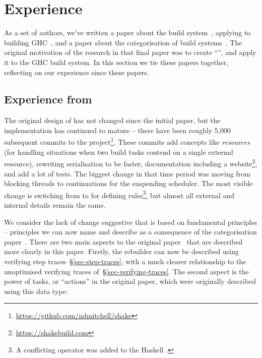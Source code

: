 \section{Experience}\label{sec-experience}

As a set of authors, we've written a paper about the \Shake build
system~\cite{mitchell2012shake}, applying \Shake to building GHC~\cite{hadrian},
and a paper about the categorisation of build
systems~\cite{mokhov2018buildsystems}. The original motivation of the research
in that final paper was to create ``\Cloud \Shake'', and apply it to the GHC
build system. In this section we tie these papers together, reflecting on our
experience since these papers.

\subsection{Experience from \Shake}\label{sec-experience-shake}

The original design of \Shake has not changed since the initial paper, but the
implementation has continued to mature -- there have been roughly 5,000
subsequent commits to the \Shake
project\footnote{\url{https://github.com/ndmitchell/shake}}. These commits add
concepts like \emph{resources} (for handling situations when two build tasks
contend on a single external resource), rewriting serialisation to be faster,
documentation including a website\footnote{\url{https://shakebuild.com}}, and
add a lot of tests. The biggest change in that time period was moving from
blocking threads to continuations for the suspending scheduler. The most visible
change is switching from \hs{*>} to  for defining rules\footnote{A
conflicting \hs{*>} operator was added to the Haskell .}, but almost
all external and internal details remain the same.

We consider the lack of change suggestive that \Shake is based on fundamental
principles -- principles we can now name and describe as a consequence
of the categorisation paper~\cite{mokhov2018buildsystems}. There are two main
aspects to the original \Shake paper~\cite{mitchell2012shake} that are described
more clearly in this paper. Firstly, the rebuilder can now be described using
verifying step traces~\S\ref{sec-step-traces}, with a much clearer relationship
to the unoptimised verifying traces of~\S\ref{sec-verifying-traces}. The second
aspect is the power of \Shake tasks, or ``actions'' in the original paper,
which were originally described using this data type:

